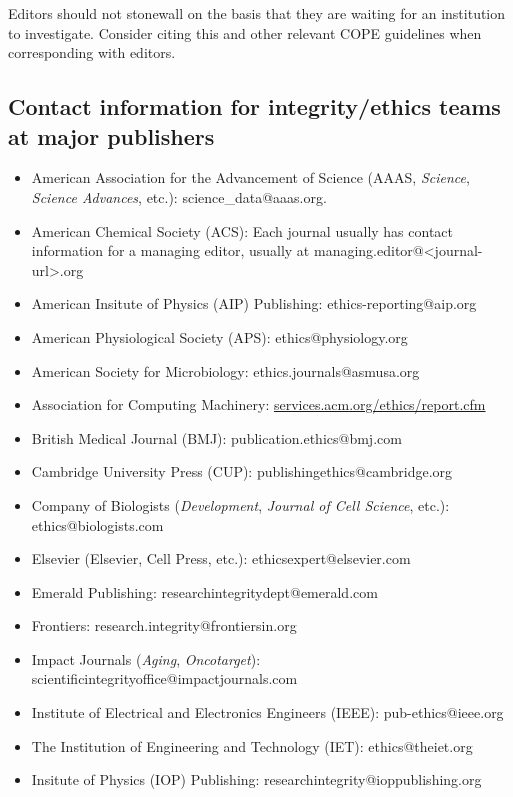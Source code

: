 \documentclass[letterpaper, 12pt]{article}
\begin{document}
Editors should not stonewall on the basis that they are waiting for an institution to investigate. Consider citing this and other relevant COPE guidelines when corresponding with editors.

\subsection*{Contact information for integrity/ethics teams at major publishers}

\begin{itemize}
    \setlength\itemsep{-0.5em}
    \item American Association for the Advancement of Science (AAAS, \textit{Science}, \textit{Science Advances}, etc.):  science\_data@aaas.org.
    \item American Chemical Society (ACS): Each journal usually has contact information for a managing editor, usually at managing.editor@<journal-url>.org
    \item American Insitute of Physics (AIP) Publishing: ethics-reporting@aip.org
    \item American Physiological Society (APS): ethics@physiology.org
    \item American Society for Microbiology: ethics.journals@asmusa.org
    \item Association for Computing Machinery: \href{https://services.acm.org/ethics/report.cfm}{services.acm.org/ethics/report.cfm}
    \item British Medical Journal (BMJ): publication.ethics@bmj.com
    \item Cambridge University Press (CUP): publishingethics@cambridge.org
    \item Company of Biologists (\textit{Development}, \textit{Journal of Cell Science}, etc.): ethics@biologists.com
    \item Elsevier (Elsevier, Cell Press, etc.): ethicsexpert@elsevier.com
    \item Emerald Publishing: researchintegritydept@emerald.com
    \item Frontiers: research.integrity@frontiersin.org
    \item Impact Journals (\textit{Aging}, \textit{Oncotarget}): scientificintegrityoffice@impactjournals.com
    \item Institute of Electrical and Electronics Engineers (IEEE): pub-ethics@ieee.org
    \item The Institution of Engineering and Technology (IET): ethics@theiet.org
    \item Insitute of Physics (IOP) Publishing: researchintegrity@ioppublishing.org

\end{itemize}
\end{document}
